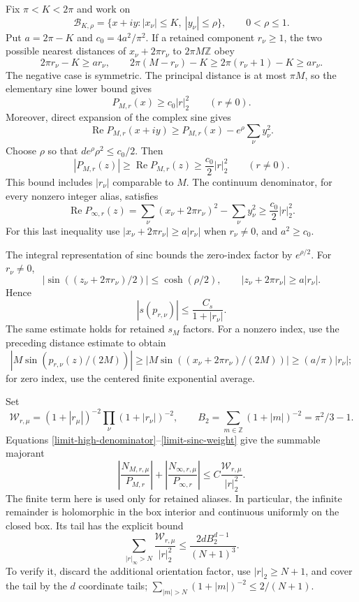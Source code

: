 \documentclass[11pt]{article}
\theoremstyle{remark}
\begin{document}
Fix $\pi<K<2\pi$ and work on
\[
 \mathcal B_{K,\rho}=
 \{x+iy:|x_\nu|\le K,\ |y_\nu|\le\rho\},
 \qquad 0<\rho\le1.
\]
Put $a=2\pi-K$ and $c_0=4a^2/\pi^2$. If a retained component
$r_\nu\ge1$, the two possible nearest distances of
$x_\nu+2\pi r_\nu$ to $2\pi M\mathbb Z$ obey
\[
 2\pi r_\nu-K\ge ar_\nu,\qquad
 2\pi(M-r_\nu)-K
 \ge2\pi(r_\nu+1)-K\ge ar_\nu.
\]
The negative case is symmetric. The principal distance is at most
$\pi M$, so the elementary sine lower bound gives
\[
 P_{M,r}(x)\ge c_0|r|_2^2\qquad(r\ne0).
\]
Moreover, direct expansion of the complex sine gives
\[
 \operatorname{Re}P_{M,r}(x+iy)
 \ge P_{M,r}(x)-e^\rho\sum_\nu y_\nu^2.
\]
Choose $\rho$ so that $de^\rho\rho^2\le c_0/2$. Then
\begin{equation}\label{limit-high-denominator}
 |P_{M,r}(z)|\ge\operatorname{Re}P_{M,r}(z)
 \ge\frac{c_0}{2}|r|_2^2\qquad(r\ne0).
\end{equation}
This bound includes $|r_\nu|$ comparable to $M$. The continuum
denominator, for every nonzero integer alias, satisfies
\begin{equation}\label{limit-high-denominator-infinite}
 \operatorname{Re}P_{\infty,r}(z)
 =\sum_\nu(x_\nu+2\pi r_\nu)^2-\sum_\nu y_\nu^2
 \ge\frac{c_0}{2}|r|_2^2.
\end{equation}
For this last inequality use $|x_\nu+2\pi r_\nu|\ge a|r_\nu|$
when $r_\nu\ne0$, and $a^2\ge c_0$.

The integral representation of sinc bounds the zero-index factor by
$e^{\rho/2}$. For $r_\nu\ne0$,
\[
 |\sin((z_\nu+2\pi r_\nu)/2)|\le\cosh(\rho/2),
 \qquad |z_\nu+2\pi r_\nu|\ge a|r_\nu|.
\]
Hence
\begin{equation}\label{limit-sinc-weight}
 |s(p_{r,\nu})|\le\frac{C_s}{1+|r_\nu|}.
\end{equation}
The same estimate holds for retained $s_M$ factors. For a nonzero
index, use the preceding distance estimate to obtain
\[
 |M\sin(p_{r,\nu}(z)/(2M))|
 \ge |M\sin((x_\nu+2\pi r_\nu)/(2M))|
 \ge(a/\pi)|r_\nu|;
\]
for zero index, use the centered finite exponential average.

Set
\[
 \mathcal W_{r,\mu}=(1+|r_\mu|)^{-2}
                         \prod_\nu(1+|r_\nu|)^{-2},
 \qquad
 B_2=\sum_{m\in\mathbb Z}(1+|m|)^{-2}=\pi^2/3-1.
\]
Equations \eqref{limit-high-denominator}--\eqref{limit-sinc-weight}
give the summable majorant
\begin{equation}\label{limit-majorant}
 \left|\frac{N_{M,r,\mu}}{P_{M,r}}\right|
 +\left|\frac{N_{\infty,r,\mu}}{P_{\infty,r}}\right|
 \le C\frac{\mathcal W_{r,\mu}}{|r|_2^2}.
\end{equation}
The finite term here is used only for retained aliases. In particular,
the infinite remainder is holomorphic in the box interior and
continuous uniformly on the closed box. Its tail has the explicit bound
\begin{equation}\label{limit-tail}
 \sum_{|r|_\infty>N}\frac{\mathcal W_{r,\mu}}{|r|_2^2}
 \le\frac{2d B_2^{d-1}}{(N+1)^3}.
\end{equation}
To verify it, discard the additional orientation factor, use
$|r|_2\ge N+1$, and cover the tail by the $d$ coordinate tails;
$\sum_{|m|>N}(1+|m|)^{-2}\le2/(N+1)$.
\end{document}
